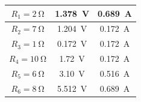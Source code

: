 \documentclass[14pt]{extarticle}
\begin{document}
\begin{enumerate}
\begin{table}[H]
\begin{tabular}{| c | c | c |}
$R_{1} = \SI{2}{\ohm}$ & \SI{1.378}{\volt} & \SI{0.689}{\ampere} \\ \hline
$R_{2} = \SI{7}{\ohm}$ & \SI{1.204}{\volt} & \SI{0.172}{\ampere} \\ \hline
$R_{3} = \SI{1}{\ohm}$ & \SI{0.172}{\volt} & \SI{0.172}{\ampere} \\ \hline
$R_{4} = \SI{10}{\ohm}$ & \SI{1.72}{\volt} & \SI{0.172}{\ampere} \\ \hline
$R_{5} = \SI{6}{\ohm}$ & \SI{3.10}{\volt} & \SI{0.516}{\ampere} \\ \hline
$R_{6} = \SI{8}{\ohm}$ & \SI{5.512}{\volt} & \SI{0.689}{\ampere} \\ \hline
\end{tabular}
\end{table}

\end{enumerate}
\end{document}
